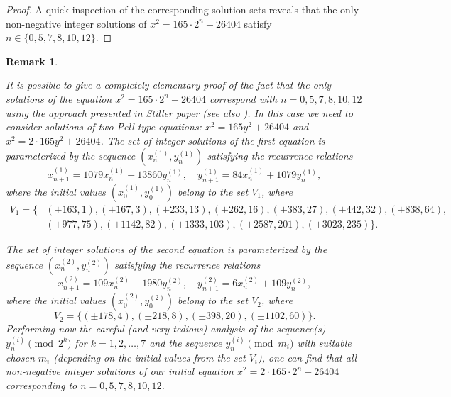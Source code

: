 \documentclass[10pt]{amsart}
\theoremstyle{plain}
\newtheorem{rem}[thm]{Remark}
\begin{document}
\begin{proof}
A quick inspection of the corresponding solution sets reveals that the only non-negative integer solutions of $x^2=165\cdot 2^{n}+26404$ satisfy $n\in\{0,5,7,8,10,12\}$.

\end{proof}

\begin{rem}\label{rem1}
{\rm It is possible to give a completely elementary proof of the fact that the only solutions of the equation $x^2=165\cdot 2^{n}+26404$ correspond with $n=0,5,7,8,10,12$ using the approach presented in Stiller paper \cite{Sti} (see also \cite{Has, Tza}). In this case we need to consider solutions of two Pell type equations: $x^2=165y^2+26404$ and $x^2=2\cdot 165y^2+26404$. The set of integer solutions of the first equation is parameterized by the sequence $(x_{n}^{(1)},y_{n}^{(1)})$ satisfying the recurrence relations
\begin{equation*}
x_{n+1}^{(1)} = 1079x_{n}^{(1)} + 13860y_{n}^{(1)}, \quad y_{n+1}^{(1)} = 84x_{n}^{(1)} + 1079y_{n}^{(1)},
\end{equation*}
where the initial values $(x_{0}^{(1)},y_{0}^{(1)})$ belong to the set $V_{1}$, where
\begin{align*}
V_{1}=\{&(\pm 163,1), (\pm 167,3), (\pm 233,13), (\pm 262,16), (\pm 383, 27), (\pm 442,32), (\pm 838,64),\\
        &(\pm 977,75), (\pm 1142, 82), (\pm 1333, 103), (\pm 2587, 201), (\pm 3023, 235)\}.
\end{align*}

The set of integer solutions of the second equation is parameterized by the sequence $(x_{n}^{(2)},y_{n}^{(2)})$ satisfying the recurrence relations
\begin{equation*}
x_{n+1}^{(2)} = 109x_{n}^{(2)} + 1980y_{n}^{(2)}, \quad y_{n+1}^{(2)} = 6x_{n}^{(2)} + 109y_{n}^{(2)},
\end{equation*}
where the initial values $(x_{0}^{(2)},y_{0}^{(2)})$ belong to the set $V_{2}$, where
\begin{equation*}
V_{2}=\{(\pm 178, 4), (\pm 218, 8), (\pm 398, 20), (\pm 1102, 60)\}.
\end{equation*}
Performing now the careful (and very tedious) analysis of the sequence(s) $y_{n}^{(i)}\pmod{2^{k}}$ for $k=1,2,\ldots,7$ and the sequence $y_{n}^{(i)}\pmod{m_{i}}$ with suitable chosen $m_{i}$ (depending on the initial values from the set $V_{i}$), one can find that all non-negative integer solutions of our initial equation $x^2=2\cdot 165\cdot2^{n}+26404$ corresponding to $n=0,5,7,8,10,12$.
}
\end{rem}
\end{document}
